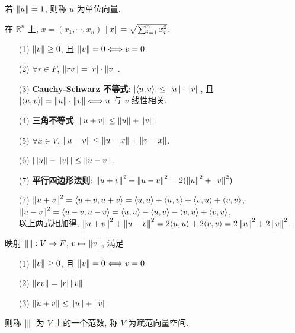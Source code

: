 \documentclass{note}
\begin{document}
\begin{df}[单位向量]
    若 $\left\lVert u\right\rVert=1$, 则称 $u$ 为单位向量.
\end{df}

\begin{eg}
    在 $\mathbb{R}^n$ 上, $x=(x_1,\cdots,x_n)$ $\left\lVert x\right\rVert=\sqrt{\sum_{i=1}^nx_i^2}$.
\end{eg}

\begin{thm}
    \begin{itemize}
        \item[(1)] $\left\lVert v\right\rVert\geq 0$, 且 $\left\lVert v\right\rVert=0\Longleftrightarrow v=0$.
        \item[(2)] $\forall r\in F$, $\left\lVert rv\right\rVert=\left\lvert r\right\rvert\cdot\left\lVert v\right\rVert$.
        \item[(3)] \textbf{Cauchy-Schwarz 不等式}: $\left\lvert\langle u,v\rangle\right\rvert\leq\left\lVert u\right\rVert\cdot\left\lVert v\right\rVert$, 且 $\left\lvert\langle u,v\rangle\right\rvert=\left\lVert u\right\rVert\cdot\left\lVert v\right\rVert\Longleftrightarrow u$ 与 $v$ 线性相关.
        \item[(4)] \textbf{三角不等式}: $\left\lVert u+v\right\rVert\leq\left\lVert u\right\rVert+\left\lVert v\right\rVert$.
        \item[(5)] $\forall x\in V$, $\left\lVert u-v\right\rVert\leq\left\lVert u-x\right\rVert+\left\lVert v-x\right\rVert$.
        \item[(6)] $\left\lvert\left\lVert u\right\rVert-\left\lVert v\right\rVert\right\rvert\leq\left\lVert u-v\right\rVert$.
        \item[(7)] \textbf{平行四边形法则}: $\left\lVert u+v\right\rVert^2+\left\lVert u-v\right\rVert^2=2(\left\lVert u\right\rVert^2+\left\lVert v\right\rVert^2)$
    \end{itemize}
\end{thm}
\begin{pf}
    \begin{itemize}
        \item[(7)] $\left\lVert u+v\right\rVert^2=\langle u+v,u+v\rangle=\langle u,u\rangle+\langle u,v\rangle+\langle v,u\rangle+\langle v,v\rangle$, $\left\lVert u-v\right\rVert^2=\langle u-v,u-v\rangle=\langle u,u\rangle-\langle u,v\rangle-\langle v,u\rangle+\langle v,v\rangle$,\\
        以上两式相加得, $\left\lVert u+v\right\rVert^2+\left\lVert u-v\right\rVert^2=2\langle u,u\rangle+2\langle v,v\rangle=2\left\lVert u\right\rVert^2+2\left\lVert v\right\rVert^2$.
    \end{itemize}
\end{pf}

\begin{df}[范数和赋范向量空间]
    映射 $\left\lVert\right\rVert:V\rightarrow F$, $v\mapsto\left\lVert v\right\rVert$, 满足
    \begin{itemize}
        \item[(1)] $\left\lVert v\right\rVert\geq 0$, 且 $\left\lVert v\right\rVert=0\Longleftrightarrow v=0$
        \item[(2)] $\left\lVert rv\right\rVert=\left\lvert r\right\rvert\left\lVert v\right\rVert$
        \item[(3)] $\left\lVert u+v\right\rVert\leq\left\lVert u\right\rVert+\left\lVert v\right\rVert$
    \end{itemize}
    则称 $\left\lVert\right\rVert$ 为 $V$ 上的一个范数, 称 $V$ 为赋范向量空间.
\end{df}
\end{document}
